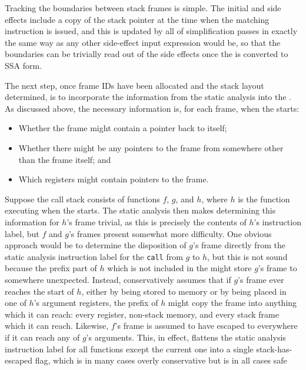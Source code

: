 Tracking the boundaries between stack frames is simple.  The initial
 and  side effects include a
copy of the stack pointer at the time when the matching instruction is
issued, and this is updated by all of {\StateMachine} simplification
passes in exactly the same way as any other side-effect input
expression would be, so that the boundaries can be trivially read out
of the side effects once the {\StateMachine} is converted to SSA form.


The next step, once frame IDs have been allocated and the stack layout
determined, is to incorporate the information from the static analysis
into the {\StateMachine}.  As discussed above, the necessary
information is, for each frame, when the {\StateMachine} starts:

\begin{itemize}
\item
  Whether the frame might contain a pointer back to itself;
\item
  Whether there might be any pointers to the frame from somewhere
  other than the frame itself; and
\item
  Which registers might contain pointers to the frame.
\end{itemize}

Suppose the call stack consists of functions $f$, $g$, and $h$, where
$h$ is the function executing when the {\StateMachine} starts.  The
static analysis then makes determining this information for $h$'s
frame trivial, as this is precisely the contents of $h$'s instruction
label, but $f$ and $g$'s
frames present somewhat more difficulty.  One obvious approach would
be to determine the disposition of $g$'s frame directly from the
static analysis instruction label for the \verb|call| from $g$ to $h$,
but this is not sound because the prefix part of $h$ which is not
included in the {\StateMachine} might store $g$'s frame to somewhere
unexpected.  Instead, {\technique} conservatively
assumes that if $g$'s frame ever reaches the start of $h$, either by
being stored to memory or by being placed in one of $h$'s argument
registers, the prefix of $h$ might copy the frame into anything which
it can reach: every register, non-stack memory, and every stack frame
which it can reach.  Likewise, $f$'s frame is assumed to have escaped
to everywhere if it can reach any of $g$'s arguments.  This, in
effect, flattens the static analysis instruction label for all
functions except the current one into a single stack-has-escaped flag,
which is in many cases overly conservative but is in all cases
safe

